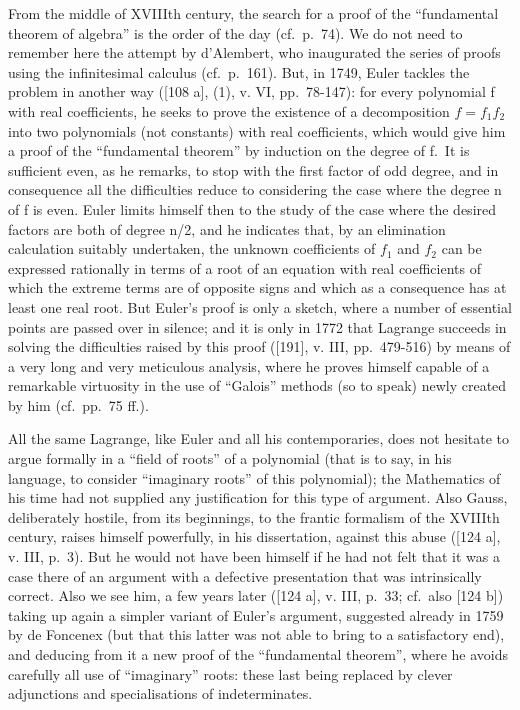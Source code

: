 From the middle of XVIIIth century, the search for a proof of the ``fundamental theorem of algebra'' is the order of the day (cf.~p.~74). We do not need to remember here the attempt by d'Alembert, who inaugurated the series of proofs using the infinitesimal calculus (cf.~p.~161). But, in 1749, Euler tackles the problem in another way ({[}108 a{]}, (1), v. VI, pp.~78-147): for every polynomial f with real coefficients, he seeks to prove the existence of a decomposition \(f = f_{1}f_{2}\) into two polynomials (not constants) with real coefficients, which would give him a proof of the ``fundamental theorem'' by induction on the degree of f.~It is sufficient even, as he remarks, to stop with the first factor of odd degree, and in consequence all the difficulties reduce to considering the case where the degree n of f is even. Euler limits himself then to the study of the case where the desired factors are both of degree n/2, and he indicates that, by an elimination calculation suitably undertaken, the unknown coefficients of \(f_{1}\) and \(f_{2}\) can be expressed rationally in terms of a root of an equation with real coefficients of which the extreme terms are of opposite signs and which as a consequence has at least one real root. But Euler's proof is only a sketch, where a number of essential points are passed over in silence; and it is only in 1772 that Lagrange succeeds in solving the difficulties raised by this proof ({[}191{]}, v. III, pp.~479-516) by means of a very long and very meticulous analysis, where he proves himself capable of a remarkable virtuosity in the use of ``Galois'' methods (so to speak) newly created by him (cf.~pp.~75 ff.).

All the same Lagrange, like Euler and all his contemporaries, does not hesitate to argue formally in a ``field of roots'' of a polynomial (that is to say, in his language, to consider ``imaginary roots'' of this polynomial); the Mathematics of his time had not supplied any justification for this type of argument. Also Gauss, deliberately hostile, from its beginnings, to the frantic formalism of the XVIIIth century, raises himself powerfully, in his dissertation, against this abuse ({[}124 a{]}, v. III, p.~3). But he would not have been himself if he had not felt that it was a case there of an argument with a defective presentation that was intrinsically correct. Also we see him, a few years later ({[}124 a{]}, v. III, p.~33; cf.~also {[}124 b{]}) taking up again a simpler variant of Euler's argument, suggested already in 1759 by de Foncenex (but that this latter was not able to bring to a satisfactory end), and deducing from it a new proof of the ``fundamental theorem'', where he avoids carefully all use of ``imaginary'' roots: these last being replaced by clever adjunctions and specialisations of indeterminates.

